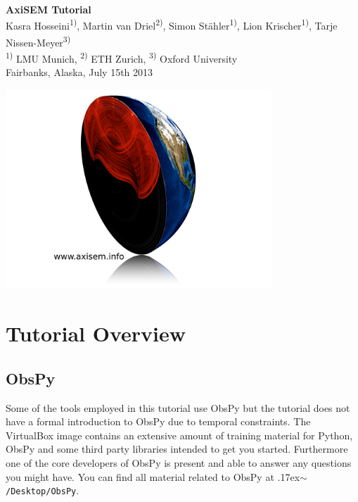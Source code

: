 \documentclass{article}
\newcommand{\ttilde}[0]{\raise.17ex\hbox{$\scriptstyle\sim$}}
\begin{document}
\begin{center}
\title{}
\LARGE{ \textbf{\sc AxiSEM Tutorial}}
\vspace*{0.1cm}\\
{\large 
Kasra Hosseini\textsuperscript{1)}, Martin van Driel\textsuperscript{2)},
Simon St\"{a}hler\textsuperscript{1)}, 
Lion Krischer\textsuperscript{1)}, Tarje Nissen-Meyer\textsuperscript{3)}} \\
{\small \textsuperscript{1)} LMU Munich, \textsuperscript{2)} ETH Zurich, 
\textsuperscript{3)} Oxford University \\
{\large Fairbanks, Alaska, July 15th 2013}}

\end{center}
   

\begin{center}
\includegraphics[width=100mm]{Axisem2png.png}
\end{center}

%
\section{Tutorial Overview}
%
\subsection{ObsPy}
Some of the tools employed in this tutorial use ObsPy but the tutorial
does not have a formal introduction to ObsPy due to temporal
constraints. The VirtualBox image contains an extensive amount of
training material for Python, ObsPy and some third party libraries
intended to get you started. Furthermore one of the core developers of
ObsPy is present and able to answer any questions you might have. You
can find all material related to ObsPy at \ttilde\verb|/Desktop/ObsPy|.
%
\end{document}
